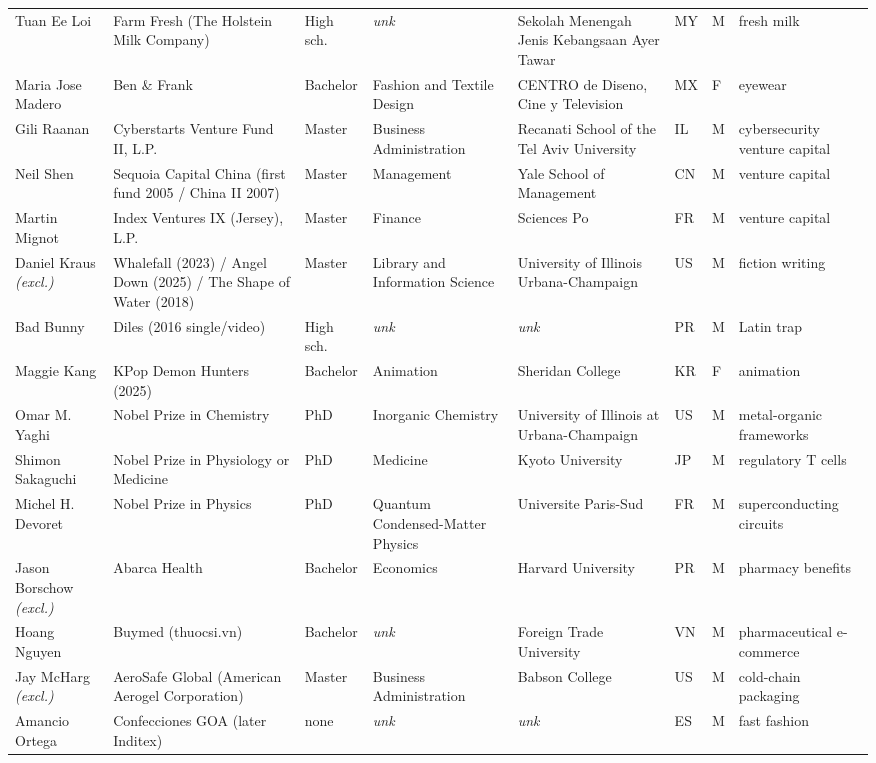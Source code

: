 \documentclass[11pt]{article}
\begin{document}
\begin{longtable}{@{}p{2.4cm}p{2.5cm}p{1.35cm}p{1.9cm}p{2.1cm}p{0.5cm}p{0.45cm}p{2.2cm}@{}}
Tuan Ee Loi & Farm Fresh (The Holstein Milk Company) & High sch. & \textit{unk} & Sekolah Menengah Jenis Kebangsaan Ayer Tawar & MY & M & fresh milk \\
Maria Jose Madero & Ben \& Frank & Bachelor & Fashion and Textile Design & CENTRO de Diseno, Cine y Television & MX & F & eyewear \\
Gili Raanan & Cyberstarts Venture Fund II, L.P. & Master & Business Administration & Recanati School of the Tel Aviv University & IL & M & cybersecurity venture capital \\
Neil Shen & Sequoia Capital China (first fund 2005 / China II 2007) & Master & Management & Yale School of Management & CN & M & venture capital \\
Martin Mignot & Index Ventures IX (Jersey), L.P. & Master & Finance & Sciences Po & FR & M & venture capital \\
Daniel Kraus \textit{\scriptsize(excl.)} & Whalefall (2023) / Angel Down (2025) / The Shape of Water (2018) & Master & Library and Information Science & University of Illinois Urbana-Champaign & US & M & fiction writing \\
Bad Bunny & Diles (2016 single/video) & High sch. & \textit{unk} & \textit{unk} & PR & M & Latin trap \\
Maggie Kang & KPop Demon Hunters (2025) & Bachelor & Animation & Sheridan College & KR & F & animation \\
Omar M. Yaghi & Nobel Prize in Chemistry & PhD & Inorganic Chemistry & University of Illinois at Urbana-Champaign & US & M & metal-organic frameworks \\
Shimon Sakaguchi & Nobel Prize in Physiology or Medicine & PhD & Medicine & Kyoto University & JP & M & regulatory T cells \\
Michel H. Devoret & Nobel Prize in Physics & PhD & Quantum Condensed-Matter Physics & Universite Paris-Sud & FR & M & superconducting circuits \\
Jason Borschow \textit{\scriptsize(excl.)} & Abarca Health & Bachelor & Economics & Harvard University & PR & M & pharmacy benefits \\
Hoang Nguyen & Buymed (thuocsi.vn) & Bachelor & \textit{unk} & Foreign Trade University & VN & M & pharmaceutical e-commerce \\
Jay McHarg \textit{\scriptsize(excl.)} & AeroSafe Global (American Aerogel Corporation) & Master & Business Administration & Babson College & US & M & cold-chain packaging \\
Amancio Ortega & Confecciones GOA (later Inditex) & none & \textit{unk} & \textit{unk} & ES & M & fast fashion \\

\end{longtable}
\end{document}
